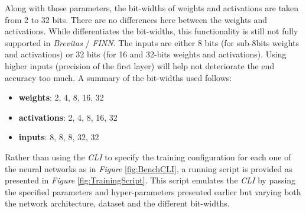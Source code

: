 Along with those parameters, the bit-widths of weights and activations are taken from 2 to 32 bits. There are no differences here between the weights and activations. While \cite{Bacchus2020} differentiates the bit-widths, this functionality is still not fully supported in \emph{Brevitas} / \emph{FINN}. The inputs are either 8 bits (for sub-8bits weights and activations) or 32 bits (for 16 and 32-bits weights and activations). Using higher inputs (precision of the first layer) will help not deteriorate the end accuracy too much. A summary of the bit-widths used follows:
\begin{itemize}
  \item \textbf{weights}: 2, 4, 8, 16, 32
  \item \textbf{activations}: 2, 4, 8, 16, 32
  \item \textbf{inputs}: 8, 8, 8, 32, 32
\end{itemize}

Rather than using the \emph{CLI} to specify the training configuration for each one of the neural networks as in \emph{Figure} \ref{fig:BenchCLI}, a running script is provided as presented in \emph{Figure} \ref{fig:TrainingScript}. This script emulates the \emph{CLI} by passing the specified parameters and hyper-parameters presented earlier but varying both the network architecture, dataset and the different bit-widths.

